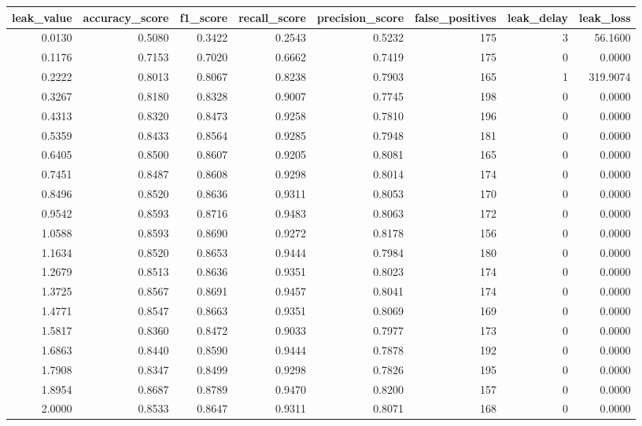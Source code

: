 \begin{tabular}{rrrrrrrr}
\toprule
leak\_value & accuracy\_score & f1\_score & recall\_score & precision\_score & false\_positives & leak\_delay & leak\_loss \\
\midrule
0.0130 & 0.5080 & 0.3422 & 0.2543 & 0.5232 & 175 & 3 & 56.1600 \\
0.1176 & 0.7153 & 0.7020 & 0.6662 & 0.7419 & 175 & 0 & 0.0000 \\
0.2222 & 0.8013 & 0.8067 & 0.8238 & 0.7903 & 165 & 1 & 319.9074 \\
0.3267 & 0.8180 & 0.8328 & 0.9007 & 0.7745 & 198 & 0 & 0.0000 \\
0.4313 & 0.8320 & 0.8473 & 0.9258 & 0.7810 & 196 & 0 & 0.0000 \\
0.5359 & 0.8433 & 0.8564 & 0.9285 & 0.7948 & 181 & 0 & 0.0000 \\
0.6405 & 0.8500 & 0.8607 & 0.9205 & 0.8081 & 165 & 0 & 0.0000 \\
0.7451 & 0.8487 & 0.8608 & 0.9298 & 0.8014 & 174 & 0 & 0.0000 \\
0.8496 & 0.8520 & 0.8636 & 0.9311 & 0.8053 & 170 & 0 & 0.0000 \\
0.9542 & 0.8593 & 0.8716 & 0.9483 & 0.8063 & 172 & 0 & 0.0000 \\
1.0588 & 0.8593 & 0.8690 & 0.9272 & 0.8178 & 156 & 0 & 0.0000 \\
1.1634 & 0.8520 & 0.8653 & 0.9444 & 0.7984 & 180 & 0 & 0.0000 \\
1.2679 & 0.8513 & 0.8636 & 0.9351 & 0.8023 & 174 & 0 & 0.0000 \\
1.3725 & 0.8567 & 0.8691 & 0.9457 & 0.8041 & 174 & 0 & 0.0000 \\
1.4771 & 0.8547 & 0.8663 & 0.9351 & 0.8069 & 169 & 0 & 0.0000 \\
1.5817 & 0.8360 & 0.8472 & 0.9033 & 0.7977 & 173 & 0 & 0.0000 \\
1.6863 & 0.8440 & 0.8590 & 0.9444 & 0.7878 & 192 & 0 & 0.0000 \\
1.7908 & 0.8347 & 0.8499 & 0.9298 & 0.7826 & 195 & 0 & 0.0000 \\
1.8954 & 0.8687 & 0.8789 & 0.9470 & 0.8200 & 157 & 0 & 0.0000 \\
2.0000 & 0.8533 & 0.8647 & 0.9311 & 0.8071 & 168 & 0 & 0.0000 \\
\bottomrule
\end{tabular}
